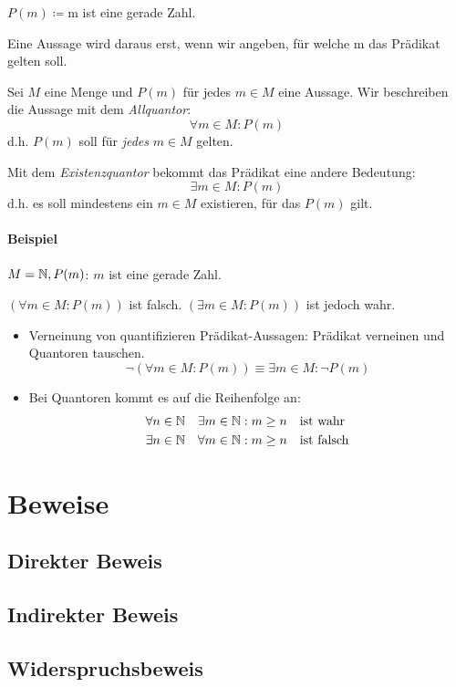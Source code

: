 $P(m)\coloneqq$\glqq m ist eine gerade Zahl. \grqq

\noindent
Eine Aussage wird daraus erst, wenn wir angeben, für welche m das Prädikat gelten soll.

Sei $M$ eine Menge und $P(m)$ für jedes $m\in M$ eine Aussage. Wir beschreiben die Aussage mit dem \emph{Allquantor}:
\begin{equation*}
  \forall m\in M: P(m)
\end{equation*}
d.h. $P(m)$ soll für \emph{jedes} $m\in M$ gelten.

Mit dem \emph{Existenzquantor} bekommt das Prädikat eine andere Bedeutung:
\begin{equation*}
  \exists m\in M: P(m)
\end{equation*}
d.h. es soll mindestens ein $m\in M$ existieren, für das $P(m)$ gilt.

\paragraph{Beispiel}
$M=\mathbb{N}, P(m)$: \glqq $m$ ist eine gerade Zahl.\grqq

$(\forall m\in M: P(m))$ ist falsch. $(\exists m\in M: P(m))$ ist jedoch wahr.

\bemerkung
\begin{itemize}
  \item Verneinung von quantifizieren Prädikat-Aussagen:
  \glqq Prädikat verneinen und Quantoren tauschen.\grqq
  \begin{equation*}
    \neg(\forall m\in M: P(m)) \equiv  \exists m\in M: \neg P(m)
  \end{equation*}
  \item Bei Quantoren kommt es auf die Reihenfolge an:
  \begin{align*}
    \forall n\in\mathbb{N} \quad\exists m\in \mathbb{N} &: m\geq n \quad\text{ist wahr}\\
    \exists n\in\mathbb{N} \quad\forall m\in \mathbb{N} &: m\geq n \quad\text{ist falsch}\\
  \end{align*}
\end{itemize}


\section{Beweise}
\subsection{Direkter Beweis}
\subsection{Indirekter Beweis}
\subsection{Widerspruchsbeweis}

